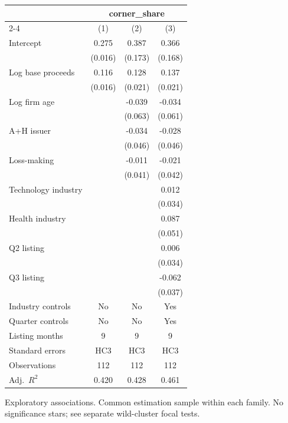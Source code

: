 \begin{table}[!htbp]\centering
\begin{tabular}{lccc}
\toprule
 & \multicolumn{3}{c}{corner\_share} \\
\cmidrule(lr){2-4}
 & (1) & (2) & (3) \\
\midrule
Intercept & 0.275 & 0.387 & 0.366 \\
 & (0.016) & (0.173) & (0.168) \\
Log base proceeds & 0.116 & 0.128 & 0.137 \\
 & (0.016) & (0.021) & (0.021) \\
Log firm age &  & -0.039 & -0.034 \\
 &  & (0.063) & (0.061) \\
A+H issuer &  & -0.034 & -0.028 \\
 &  & (0.046) & (0.046) \\
Loss-making &  & -0.011 & -0.021 \\
 &  & (0.041) & (0.042) \\
Technology industry &  &  & 0.012 \\
 &  &  & (0.034) \\
Health industry &  &  & 0.087 \\
 &  &  & (0.051) \\
Q2 listing &  &  & 0.006 \\
 &  &  & (0.034) \\
Q3 listing &  &  & -0.062 \\
 &  &  & (0.037) \\
\midrule
Industry controls & No & No & Yes \\
Quarter controls & No & No & Yes \\
Listing months & 9 & 9 & 9 \\
Standard errors & HC3 & HC3 & HC3 \\
Observations & 112 & 112 & 112 \\
Adj.\ $R^2$ & 0.420 & 0.428 & 0.461 \\
\bottomrule
\end{tabular}
\par\vspace{2pt}\begin{minipage}{0.95\linewidth}\footnotesize Exploratory associations. Common estimation sample within each family. No significance stars; see separate wild-cluster focal tests.\end{minipage}
\end{table}